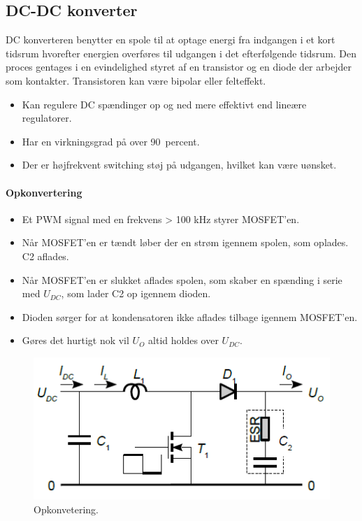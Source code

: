 \documentclass[danish]{article}
\begin{document}
\subsection{DC-DC konverter}
DC konverteren benytter en spole til at optage energi fra indgangen i et kort tidsrum hvorefter energien overføres til udgangen i det efterfølgende tidsrum. 
Den proces gentages i en evindelighed styret af en transistor og en diode der arbejder som kontakter. 
Transistoren kan være bipolar eller felteffekt.
\begin{itemize}
	\item Kan regulere DC spændinger op og ned mere effektivt end lineære regulatorer.
	\item Har en virkningsgrad på over \SI{90}{percent}.
	\item Der er højfrekvent switching støj på udgangen, hvilket kan være uønsket.
\end{itemize}

\paragraph{Opkonvertering}
\begin{itemize}
	\item Et PWM signal med en frekvens > 100 kHz styrer MOSFET’en.
	\item Når MOSFET'en er tændt løber der en strøm igennem spolen, som oplades. C2 aflades. 
	\item Når MOSFET'en er slukket aflades spolen, som skaber en spænding i serie med $U_{DC}$, som lader C2 op igennem dioden.
	\item Dioden sørger for at kondensatoren ikke aflades tilbage igennem MOSFET’en.
	\item Gøres det hurtigt nok vil $U_O$ altid holdes over $U_{DC}.$
\end{itemize}

\begin{figure} [H]
	\centering
	\includegraphics[width=0.8\linewidth]{graphics/opkonvertering}
	\caption{Opkonvetering.}
	\label{fig:opkonvertering}
\end{figure}
\end{document}
